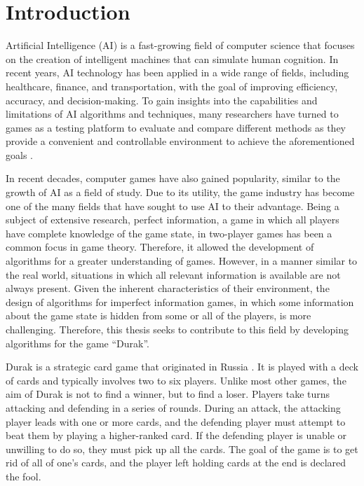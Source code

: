 \chapter*{Introduction}

Artificial Intelligence (AI) is a fast-growing field of computer science that focuses on the creation of intelligent machines that can simulate human cognition. In recent years, AI technology has been applied in a wide range of fields, including healthcare, finance, and transportation, with the goal of improving efficiency, accuracy, and decision-making. To gain insights into the capabilities and limitations of AI algorithms and techniques, many researchers have turned to games as a testing platform to evaluate and compare different methods as they provide a convenient and controllable environment to achieve the aforementioned goals \citep{yannakakis_togelius_2018}. 

In recent decades, computer games have also gained popularity, similar to the growth of AI as a field of study. Due to its utility, the game industry has become one of the many fields that have sought to use AI to their advantage. Being a subject of extensive research, perfect information, a game in which all players have complete knowledge of the game state, in two-player games has been a common focus in game theory. Therefore, it allowed the development of algorithms for a greater understanding of games. However, in a manner similar to the real world, situations in which all relevant information is available are not always present. Given the inherent characteristics of their environment, the design of algorithms for imperfect information games, in which some information about the game state is hidden from some or all of the players, is more challenging. Therefore, this thesis seeks to contribute to this field by developing algorithms for the game ``Durak''.

Durak is a strategic card game that originated in Russia \citep*{website:PAGAT_DURAK}. It is played with a deck of cards and typically involves two to six players. Unlike most other games, the aim of Durak is not to find a winner, but to find a loser. Players take turns attacking and defending in a series of rounds. During an attack, the attacking player leads with one or more cards, and the defending player must attempt to beat them by playing a higher-ranked card. If the defending player is unable or unwilling to do so, they must pick up all the cards. The goal of the game is to get rid of all of one's cards, and the player left holding cards at the end is declared the fool. 

